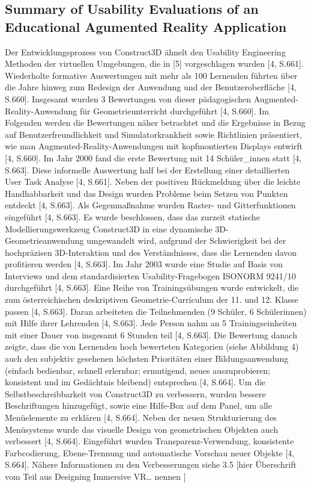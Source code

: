 \documentclass[deutsch]{llncs}
\begin{document}
\subsection{Summary of Usability Evaluations of an Educational Agumented Reality Application}
Der Entwicklungsprozess von Construct3D ähnelt den Usability Engineering Methoden der virtuellen Umgebungen, die in [5] vorgeschlagen wurden [4, S.661]. Wiederholte formative Auswertungen mit mehr als 100 Lernenden führten über die Jahre hinweg zum Redesign der Anwendung und der Benutzeroberfläche [4, S.660]. Insgesamt wurden 3 Bewertungen von dieser pädagogischen Augmented-Reality-Anwendung für Geometrieunterricht durchgeführt [4, S.660]. Im Folgenden werden die Bewertungen näher betrachtet und die Ergebnisse in Bezug auf Benutzerfreundlichkeit und Simulatorkrankheit sowie Richtlinien präsentiert, wie man Augmented-Reality-Anwendungen mit kopfmontierten Displays entwirft [4, S.660].
Im Jahr 2000 fand die erste Bewertung mit 14 Schüler\_innen statt [4, S.663]. Diese informelle Auswertung half bei der Erstellung einer detaillierten User Task Analyse [4, S.661]. Neben der positiven Rückmeldung über die leichte Handhabbarkeit und das Design wurden Probleme beim Setzen von Punkten entdeckt [4, S.663]. Als Gegenmaßnahme wurden Raster- und Gitterfunktionen eingeführt [4, S.663]. Es wurde beschlossen, dass das zurzeit statische Modellierungswerkzeug Construct3D in eine dynamische 3D-Geometrieanwendung umgewandelt wird, aufgrund der Schwierigkeit bei der hochpräzisen 3D-Interaktion und des Verständnisses, dass die Lernenden davon profitieren werden [4, S.663]. 
Im Jahr 2003 wurde eine Studie auf Basis von Interviews und dem standardisierten Usability-Fragebogen ISONORM 9241/10 durchgeführt [4, S.663]. Eine Reihe von Trainingsübungen wurde entwickelt, die zum österreichischen deskriptiven Geometrie-Curriculum der 11. und 12. Klasse passen [4, S.663].  Daran arbeiteten die Teilnehmenden (9 Schüler, 6 Schülerinnen) mit Hilfe ihrer Lehrenden [4, S.663]. Jede Person nahm an 5 Trainingseinheiten mit einer Dauer von insgesamt 6 Stunden teil [4, S.663]. Die Bewertung danach zeigte, dass die von Lernenden hoch bewerteten Kategorien (siehe Abbildung 4) auch den subjektiv gesehenen höchsten Prioritäten einer Bildungsanwendung (einfach bedienbar, schnell erlernbar; ermutigend, neues auszuprobieren; konsistent und im Gedächtnis bleibend) entsprechen [4, S.664].
\noindent
Um die Selbstbeschreibbarkeit von Construct3D zu verbessern, wurden bessere Beschriftungen hinzugefügt, sowie eine Hilfe-Box auf dem Panel, um alle Menüelemente zu erklären [4, S.664]. Neben der neuen Strukturierung des Menüsystems wurde das visuelle Design von geometrischen Objekten auch verbessert [4, S.664]. Eingeführt wurden Transparenz-Verwendung, konsistente Farbcodierung, Ebene-Trennung und automatische Vorschau neuer Objekte [4, S.664]. Nähere Informationen zu den Verbesserungen siehe 3.5 [hier Überschrift vom Teil aus Designing Immersive VR… nennen ]
\end{document}
